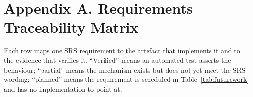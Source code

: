 \documentclass[11pt,a4paper]{article}
\begin{document}
\clearpage
{}
\section*{Appendix A. Requirements Traceability Matrix}

Each row maps one SRS requirement to the artefact that implements it and to the evidence
that verifies it. ``Verified'' means an automated test asserts the behaviour; ``partial''
means the mechanism exists but does not yet meet the SRS wording; ``planned'' means the
requirement is scheduled in Table~\ref{tab:futurework} and has no implementation to
point at.
\end{document}
